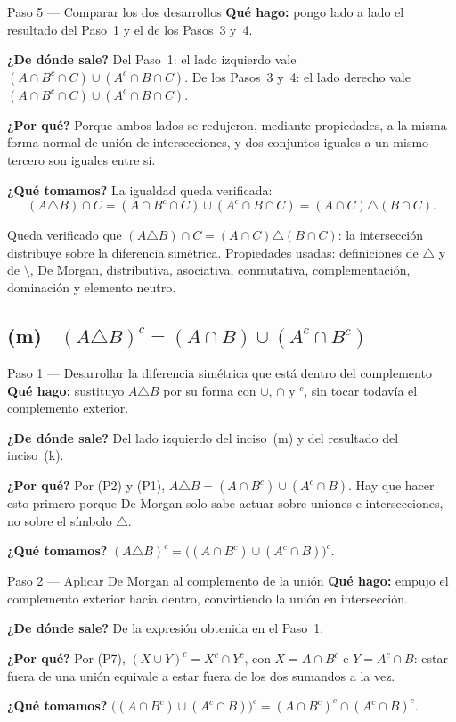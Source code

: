 \documentclass[11pt]{article}
\begin{document}
\begin{paso}{Paso 5 --- Comparar los dos desarrollos}
\textbf{Qué hago:} pongo lado a lado el resultado del Paso~1 y el de los Pasos~3 y~4.

\textbf{¿De dónde sale?} Del Paso~1: el lado izquierdo vale
$(A\cap B^{c}\cap C)\cup(A^{c}\cap B\cap C)$. De los Pasos~3 y~4: el lado derecho vale
$(A\cap B^{c}\cap C)\cup(A^{c}\cap B\cap C)$.

\textbf{¿Por qué?} Porque ambos lados se redujeron, mediante propiedades, a la misma forma
normal de unión de intersecciones, y dos conjuntos iguales a un mismo tercero son iguales entre
sí.

\textbf{¿Qué tomamos?} La igualdad queda verificada:
\[
(A\triangle B)\cap C=(A\cap B^{c}\cap C)\cup(A^{c}\cap B\cap C)=(A\cap C)\triangle(B\cap C).
\]
\end{paso}

\begin{resp}
Queda verificado que $(A\triangle B)\cap C=(A\cap C)\triangle(B\cap C)$: la intersección
distribuye sobre la diferencia simétrica. Propiedades usadas: definiciones de $\triangle$ y de
$\setminus$, De Morgan, distributiva, asociativa, conmutativa, complementación, dominación y
elemento neutro.
\end{resp}

\subsection*{(m) \ $(A\triangle B)^{c}=(A\cap B)\cup(A^{c}\cap B^{c})$}

\begin{paso}{Paso 1 --- Desarrollar la diferencia simétrica que está dentro del complemento}
\textbf{Qué hago:} sustituyo $A\triangle B$ por su forma con $\cup$, $\cap$ y $^{c}$, sin tocar
todavía el complemento exterior.

\textbf{¿De dónde sale?} Del lado izquierdo del inciso~(m) y del resultado del inciso~(k).

\textbf{¿Por qué?} Por (P2) y (P1), $A\triangle B=(A\cap B^{c})\cup(A^{c}\cap B)$. Hay que hacer
esto primero porque De Morgan solo sabe actuar sobre uniones e intersecciones, no sobre el
símbolo $\triangle$.

\textbf{¿Qué tomamos?}
$(A\triangle B)^{c}=\bigl((A\cap B^{c})\cup(A^{c}\cap B)\bigr)^{c}$.
\end{paso}

\begin{paso}{Paso 2 --- Aplicar De Morgan al complemento de la unión}
\textbf{Qué hago:} empujo el complemento exterior hacia dentro, convirtiendo la unión en
intersección.

\textbf{¿De dónde sale?} De la expresión obtenida en el Paso~1.

\textbf{¿Por qué?} Por (P7), $(X\cup Y)^{c}=X^{c}\cap Y^{c}$, con $X=A\cap B^{c}$ e
$Y=A^{c}\cap B$: estar fuera de una unión equivale a estar fuera de los dos sumandos a la vez.

\textbf{¿Qué tomamos?}
$\bigl((A\cap B^{c})\cup(A^{c}\cap B)\bigr)^{c}=(A\cap B^{c})^{c}\cap(A^{c}\cap B)^{c}$.
\end{paso}
\end{document}
